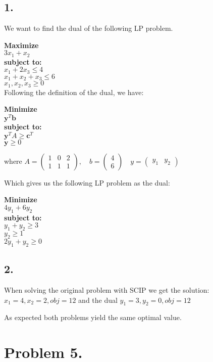 \documentclass[12pt]{report}
\begin{document}
\subsection*{1.}

We want to find the dual of the following LP problem.

\textbf{Maximize}\\
  $3x_1 + x_2$\\
\textbf{subject to:}\\
  $ x_1 + 2x_3 \le 4 $ \\
  $ x_1 + x_2 + x_3\le 6 $ \\
  $ x_1,x_2,x_3 \ge 0 $ \\

Following the definition of the dual, we have:

\textbf{Minimize}\\
  $\textbf{y}^T \textbf{b} $\\
\textbf{subject to:}\\
  $ \textbf{y}^T A \ge \textbf{c}^T $ \\
  $ \textbf{y} \ge 0 $ 

where $A = \left(
\begin{matrix}
  1 & 0 & 2 \\
  1 & 1 & 1 
\end{matrix}
\right),
\quad 
b = \left(
\begin{matrix}
  4 \\
  6 
\end{matrix}
\right)
\quad 
y = \left(
\begin{matrix}
  y_1 & y_2  
\end{matrix}
\right) $ 

Which gives us the following LP problem as the dual:

\textbf{Minimize}\\
  $ 4y_1 + 6y_2 $\\
\textbf{subject to:}\\
  $ y_1 + y_2  \ge 3 $ \\
  $ y_2        \ge 1 $ \\
  $ 2y_1 + y_2 \ge 0 $ 

\subsection*{2.}

When solving the original problem with SCIP we get the solution:
$ x_1 = 4, x_2 = 2, obj = 12$
and the dual
$ y_1 = 3, y_2 = 0, obj = 12$

As expected both problems yield the same optimal value.



\section*{Problem 5.}
\end{document}
